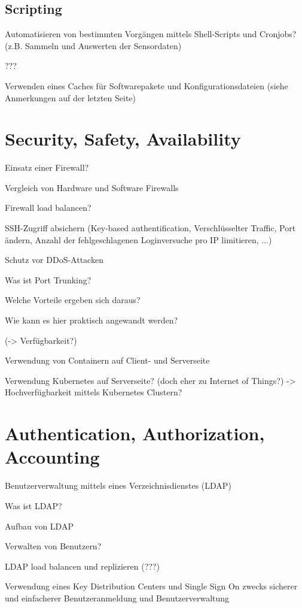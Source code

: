 \subsection{Scripting}
\label{subsec:Scripting}
Automatisieren von bestimmten Vorgängen mittels Shell-Scripts und Cronjobs? (z.B. Sammeln und Auswerten der Sensordaten)

???

Verwenden eines Caches für Softwarepakete und Konfigurationsdateien (siehe Anmerkungen auf der letzten Seite)


\section{Security, Safety, Availability}
\label{sec:Security, Safety, Availability}
Einsatz einer Firewall?

Vergleich von Hardware und Software Firewalls

Firewall load balancen?

SSH-Zugriff absichern (Key-based authentification, Verschlüsselter Traffic, Port ändern, Anzahl der fehlgeschlagenen Loginversuche pro IP limitieren, ...)

Schutz vor DDoS-Attacken

Was ist Port Trunking?

Welche Vorteile ergeben sich daraus?

Wie kann es hier praktisch angewandt werden?

(-> Verfügbarkeit?)

Verwendung von Containern auf Client- und Serverseite

Verwendung Kubernetes auf Serverseite? (doch eher zu Internet of Things?) -> Hochverfügbarkeit mittels Kubernetes Clustern?

\section{Authentication, Authorization, Accounting}
\label{sec:Authentication, Authorization, Accounting}
Benutzerverwaltung mittels eines Verzeichnisdienstes (LDAP)

Was ist LDAP?

Aufbau von LDAP

Verwalten von Benutzern?

LDAP load balancen und replizieren (???)

Verwendung eines Key Distribution Centers und Single Sign On zwecks sicherer und einfacherer Benutzeranmeldung und Benutzerverwaltung

